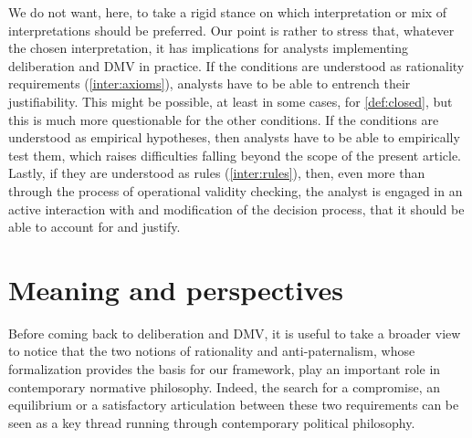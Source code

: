 \documentclass[version=3.21, pagesize, twoside=off, bibliography=totoc, DIV=calc, fontsize=12pt, a4paper, french, english]{scrartcl}
\begin{document}
We do not want, here, to take a rigid stance on which interpretation or mix of interpretations should be preferred. 
Our point is rather to stress that, whatever the chosen interpretation, it has implications for analysts implementing deliberation and DMV in practice. 
If the conditions are understood as rationality requirements (\ref{inter:axioms}), analysts have to be able to entrench their justifiability. 
This might be possible, at least in some cases, for \cref{def:closed}, but this is much more questionable for the other conditions. 
If the conditions are understood as empirical hypotheses, then analysts have to be able to empirically test them, which raises difficulties falling beyond the scope of the present article.
Lastly, if they are understood as rules (\ref{inter:rules}), then, even more than through the process of operational validity checking, the analyst is engaged in an active interaction with and modification of the decision process, that it should be able to account for and justify.


\section{Meaning and perspectives}
\label{disc}
Before coming back to deliberation and DMV, it is useful to take a broader view to notice that the two notions of rationality and anti-paternalism, whose formalization provides the basis for our framework, play an important role in contemporary normative philosophy. 
Indeed, the search for a compromise, an equilibrium or a satisfactory articulation between these two requirements can be seen as a key thread running through contemporary political philosophy.
\end{document}
